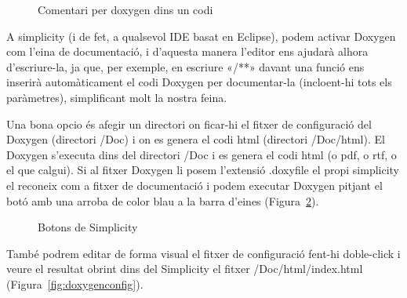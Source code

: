 \begin{figure}
 \centering
 \caption{Comentari per doxygen dins un codi}
 \label{fig:doxygencode}
\end{figure}

A simplicity (i de fet, a qualsevol IDE basat en Eclipse), podem activar Doxygen com l'eina de documentació, i d'aquesta manera l'editor ens ajudarà alhora d'escriure-la, ja que, per exemple, en escriure «/**» davant una funció ens inserirà automàticament el codi Doxygen per documentar-la (incloent-hi tots els paràmetres), simplificant molt la nostra feina.

Una bona opcio és afegir un directori on ficar-hi el fitxer de configuració del Doxygen (directori /Doc) i on es genera el codi html (directori /Doc/html). El Doxygen s'executa dins del directori /Doc i es genera el codi html (o pdf, o rtf, o el que calgui). Si al fitxer Doxygen li posem l'extensió .doxyfile el propi simplicity el reconeix com a fitxer de documentació i podem executar Doxygen pitjant el botó amb una arroba de color blau a la barra d'eines (Figura~\ref{fig:doxygenbutton}).

\begin{figure}[h!]
 \centering
 \caption{Botons de Simplicity}
 \label{fig:doxygenbutton}
\end{figure}


També podrem editar de forma visual el fitxer de configuració fent-hi doble-click i veure el resultat obrint dins del Simplicity el fitxer /Doc/html/index.html (Figura~\ref{fig:doxygenconfig}).

